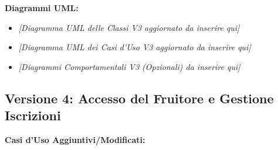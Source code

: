 \documentclass[a4paper,12pt]{article}
\begin{document}
\newpage
\textbf{Diagrammi UML:}
\begin{itemize}
    \item \textit{[Diagramma UML delle Classi V3 aggiornato da inserire qui]}
    \item \textit{[Diagramma UML dei Casi d'Uso V3 aggiornato da inserire qui]}
    \item \textit{[Diagrammi Comportamentali V3 (Opzionali) da inserire qui]}
\end{itemize}

\newpage
\subsection{Versione 4: Accesso del Fruitore e Gestione Iscrizioni}
\textbf{Casi d'Uso Aggiuntivi/Modificati:}
\end{document}
